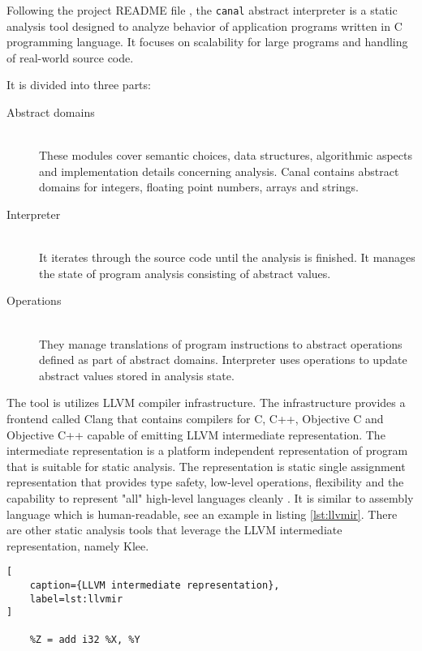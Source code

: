\documentclass[12pt,final,oneside]{fithesis2}
\theoremstyle{definition}
\begin{document}
Following the project README file \cite{Klic12-1}, the \texttt{canal}
abstract interpreter is a static analysis tool designed to analyze behavior
of application programs written in C programming language. It focuses
on scalability for large programs and handling of real-world source code.

It is divided into three parts:

\begin{description}

\item[Abstract domains] \hfill \\
These modules cover semantic choices, data
structures, algorithmic aspects and implementation details concerning
analysis. Canal contains abstract domains for integers, floating point
numbers, arrays and strings.

\item[Interpreter] \hfill \\
It iterates through the source code until the analysis
is finished. It manages the state of program analysis consisting of
abstract values.

\item[Operations] \hfill \\
They manage translations of program instructions to
abstract operations defined as part of abstract domains. Interpreter uses
operations to update abstract values stored in analysis state.

\end{description}

The tool is utilizes LLVM compiler infrastructure. The infrastructure
provides a frontend called Clang that contains compilers for C, C++,
Objective C and Objective C++ capable of emitting LLVM intermediate
representation. The intermediate representation is a platform independent
representation of program that is suitable for static analysis.
The representation is static single assignment representation that provides
type safety, low-level operations, flexibility and the capability to
represent "all" high-level languages cleanly \cite{llvm13-1}. It is similar
to assembly language which is human-readable, see an example in
listing \ref{lst:llvmir}. There are other static analysis tools that leverage
the LLVM intermediate representation, namely Klee.

\begin{lstlisting}[
    caption={LLVM intermediate representation},
    label=lst:llvmir
]

    %Z = add i32 %X, %Y

\end{lstlisting}
\end{document}
